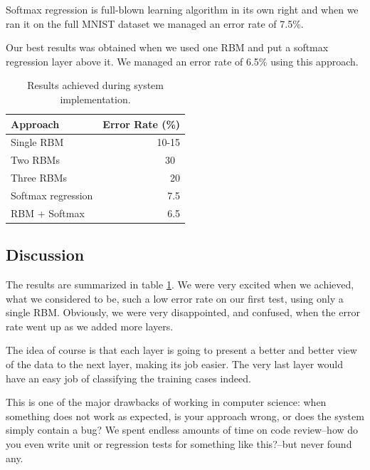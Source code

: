 \documentclass[11pt]{article}
\begin{document}
Softmax regression is full-blown learning algorithm in its own right and when we ran it on the full MNIST dataset we managed an error rate of 7.5\%.

Our best results was obtained when we used one RBM and put a softmax regression layer above it.  We managed an error rate of 6.5\% using this approach.

\begin{table}[htb!]
\centering
\begin{tabular}{|l|r|}        \hline
Approach & Error Rate (\%) \\ \hline
Single RBM & 10-15 \\         \hline
Two RBMs & 30\ \\             \hline
Three RBMs & 20 \\            \hline
Softmax regression & 7.5 \\   \hline
RBM + Softmax & 6.5 \\        \hline
\end{tabular}
\caption{Results achieved during system implementation.}
\label{tbl:results}
\end{table}

\subsection{Discussion}

The results are summarized in table \ref{tbl:results}.  We were very excited when we achieved, what we considered to be, such a low error rate on our first test, using only a single RBM.  Obviously, we were very disappointed, and confused, when the error rate went up as we added more layers.

The idea of course is that each layer is going to present a better and better view of the data to the next layer, making its job easier.  The very last layer would have an easy job of classifying the training cases indeed.

This is one of the major drawbacks of working in computer science: when something does not work as expected, is your approach wrong, or does the system simply contain a bug?  We spent endless amounts of time on code review--how do you even write unit or regression tests for something like this?--but never found any.
\end{document}
